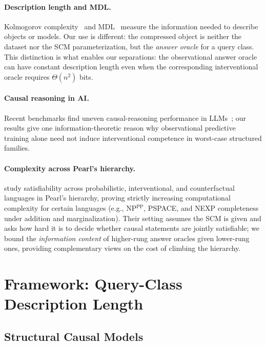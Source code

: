 \documentclass{article}
\theoremstyle{plain}
\theoremstyle{definition}
\begin{document}
\paragraph{Description length and MDL.}
Kolmogorov complexity~\citep{kolmogorov1965three,li2008introduction} and MDL~\citep{grunwald2007minimum} measure the information needed to describe objects or models. Our use is different: the compressed object is neither the dataset nor the SCM parameterization, but the \emph{answer oracle} for a query class. This distinction is what enables our separations: the observational answer oracle can have constant description length even when the corresponding interventional oracle requires $\Theta(n^2)$ bits.

\paragraph{Causal reasoning in AI.}
Recent benchmarks find uneven causal-reasoning performance in LLMs~\citep{kiciman2023causal,jin2024cladder}; our results give one information-theoretic reason why observational predictive training alone need not induce interventional competence in worst-case structured families.

\paragraph{Complexity across Pearl's hierarchy.}
\citet{dorfler2024complexity} study satisfiability across probabilistic, interventional, and counterfactual languages in Pearl's hierarchy, proving strictly increasing computational complexity for certain languages (e.g., NP$^{\mathrm{PP}}$, PSPACE, and NEXP completeness under addition and marginalization). Their setting assumes the SCM is given and asks how hard it is to decide whether causal statements are jointly satisfiable; we bound the \emph{information content} of higher-rung answer oracles given lower-rung ones, providing complementary views on the cost of climbing the hierarchy.


\section{Framework: Query-Class Description Length}
\label{sec:framework}

\subsection{Structural Causal Models}
\label{sec:scm-review}
\end{document}
